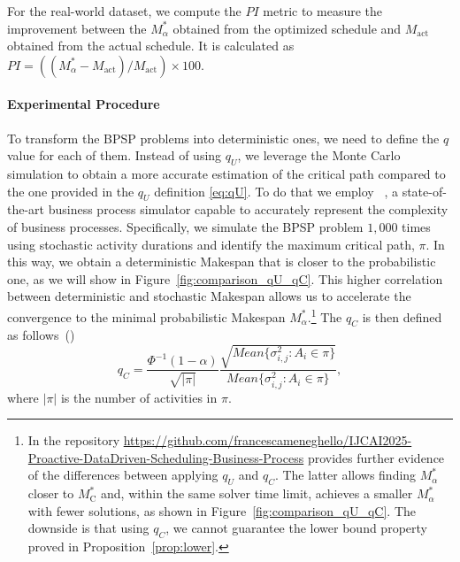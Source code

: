 For the real-world dataset, we compute the $PI$ metric to measure the improvement between the $M^*_{\alpha}$ obtained from the optimized schedule and $M_{\text{act}}$ obtained from the actual schedule. It is calculated as $PI = ((M^*_{\alpha} - M_{\text{act}})/M_{\text{act}}) \times 100$.

\paragraph{Experimental Procedure} To transform the BPSP problems into deterministic ones, we need to define the $q$ value for each of them.
Instead of using $q_U$, we leverage the Monte Carlo simulation to obtain a more accurate estimation of the critical path compared to the one provided in the $q_U$ definition \eqref{eq:qU}.
To do that we employ \rims~\cite{MeneghelloFGR25}, a state-of-the-art business process simulator capable to accurately represent the complexity of business processes.
Specifically, we simulate the BPSP problem $1,000$ times using stochastic activity durations and identify the maximum critical path, $\pi$.
In this way, we obtain a deterministic Makespan that is closer to the probabilistic one, as we will show in Figure~\ref{fig:comparison_qU_qC}. This higher correlation between deterministic and stochastic Makespan allows us to accelerate the convergence to the minimal probabilistic Makespan $M_\alpha^*$.\footnote{In the repository \url{https://github.com/francescameneghello/IJCAI2025-Proactive-DataDriven-Scheduling-Business-Process} provides further evidence of the differences between applying $q_U$ and $q_C$. The latter allows finding $M^*_{\alpha}$ closer to $M^*_{\text{C}}$ and, within the same solver time limit, achieves a smaller $M^*_{\alpha}$ with fewer solutions, as shown in Figure~\ref{fig:comparison_qU_qC}. The downside is that using $q_C$, we cannot guarantee the lower bound property proved in Proposition~\ref{prop:lower}. }
The $q_C$ is then defined as follows~(\cite{beck2007proactive})
\[
q_C = \frac{\Phi^{-1}(1-\alpha)}{\sqrt{|\pi|}}\frac{\sqrt{Mean\{\sigma^2_{i,j}: A_i \in \pi\}}}{Mean\{\sigma^2_{i,j}: A_i \in \pi\}},
\] where $|\pi|$ is the number of activities in $\pi$.

